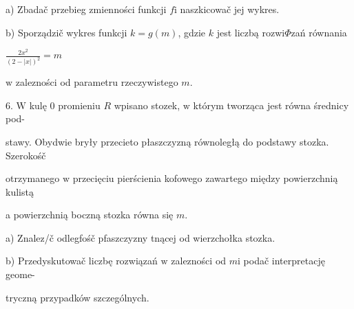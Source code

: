 \documentclass[a4paper,12pt]{article}
\begin{document}
a) Zbadač przebieg zmienności funkcji $f\mathrm{i}$ naszkicowač jej wykres.

b) Sporządzič wykres funkcji $k=g(m)$, gdzie $k$ jest liczbą rozwi$\Phi$zań równania

$\displaystyle \frac{2x^{2}}{(2-|x|)^{2}}=m$

$\mathrm{w}$ zalezności od parametru rzeczywistego $m.$

6. $\mathrm{W}$ kulę $0$ promieniu $R$ wpisano stozek, $\mathrm{w}$ którym tworząca jest równa średnicy pod-

stawy. Obydwie bryły przecieto płaszczyzną równoległą do podstawy stozka. Szerokośč

otrzymanego $\mathrm{w}$ przecięciu pierścienia kofowego zawartego między powierzchnią kulistą

a powierzchnią boczną stozka równa się $m.$

a) Znalez/č odlegfośč pfaszczyzny tnącej od wierzchołka stozka.

b) Przedyskutowač liczbę rozwiązań $\mathrm{w}$ zalezności od $m\mathrm{i}$ podač interpretację geome-

tryczną przypadków szczególnych.
\end{document}

